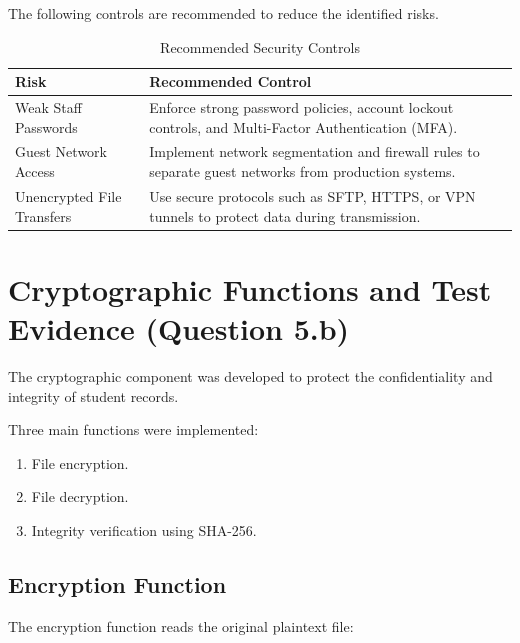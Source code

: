 \documentclass[12pt,a4paper]{article}
\begin{document}
The following controls are recommended to reduce the identified risks.

\begin{table}[htbp]
\centering
\caption{Recommended Security Controls}
\begin{tabular}{p{5cm} p{9cm}}
\toprule
\textbf{Risk} & \textbf{Recommended Control} \\
\midrule

Weak Staff Passwords &
Enforce strong password policies, account lockout controls, and Multi-Factor Authentication (MFA). \\

Guest Network Access &
Implement network segmentation and firewall rules to separate guest networks from production systems. \\

Unencrypted File Transfers &
Use secure protocols such as SFTP, HTTPS, or VPN tunnels to protect data during transmission. \\

\bottomrule
\end{tabular}
\end{table}


\newpage

\section{Cryptographic Functions and Test Evidence (Question 5.b)}

The cryptographic component was developed to protect the confidentiality and integrity of student records.

Three main functions were implemented:

\begin{enumerate}
    \item File encryption.
    \item File decryption.
    \item Integrity verification using SHA-256.
\end{enumerate}

\subsection{Encryption Function}

The encryption function reads the original plaintext file:
\end{document}
